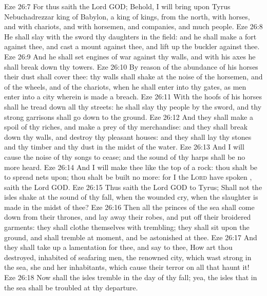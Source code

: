 \vs Eze 26:7 For thus saith the Lord GOD; Behold, I will bring upon Tyrus Nebuchadrezzar king of Babylon, a king of kings, from the north, with horses, and with chariots, and with horsemen, and companies, and much people.
\vs Eze 26:8 He shall slay with the sword thy daughters in the field: and he shall make a fort against thee, and cast a mount against thee, and lift up the buckler against thee.
\vs Eze 26:9 And he shall set engines of war against thy walls, and with his axes he shall break down thy towers.
\vs Eze 26:10 By reason of the abundance of his horses their dust shall cover thee: thy walls shall shake at the noise of the horsemen, and of the wheels, and of the chariots, when he shall enter into thy gates, as men enter into a city wherein is made a breach.
\vs Eze 26:11 With the hoofs of his horses shall he tread down all thy streets: he shall slay thy people by the sword, and thy strong garrisons shall go down to the ground.
\vs Eze 26:12 And they shall make a spoil of thy riches, and make a prey of thy merchandise: and they shall break down thy walls, and destroy thy pleasant houses: and they shall lay thy stones and thy timber and thy dust in the midst of the water.
\vs Eze 26:13 And I will cause the noise of thy songs to cease; and the sound of thy harps shall be no more heard.
\vs Eze 26:14 And I will make thee like the top of a rock: thou shalt be  to spread nets upon; thou shalt be built no more: for I the \textsc{Lord} have spoken , saith the Lord GOD.
\vs Eze 26:15 Thus saith the Lord GOD to Tyrus; Shall not the isles shake at the sound of thy fall, when the wounded cry, when the slaughter is made in the midst of thee?
\vs Eze 26:16 Then all the princes of the sea shall come down from their thrones, and lay away their robes, and put off their broidered garments: they shall clothe themselves with trembling; they shall sit upon the ground, and shall tremble at  moment, and be astonished at thee.
\vs Eze 26:17 And they shall take up a lamentation for thee, and say to thee, How art thou destroyed,  inhabited of seafaring men, the renowned city, which wast strong in the sea, she and her inhabitants, which cause their terror  on all that haunt it!
\vs Eze 26:18 Now shall the isles tremble in the day of thy fall; yea, the isles that  in the sea shall be troubled at thy departure.
